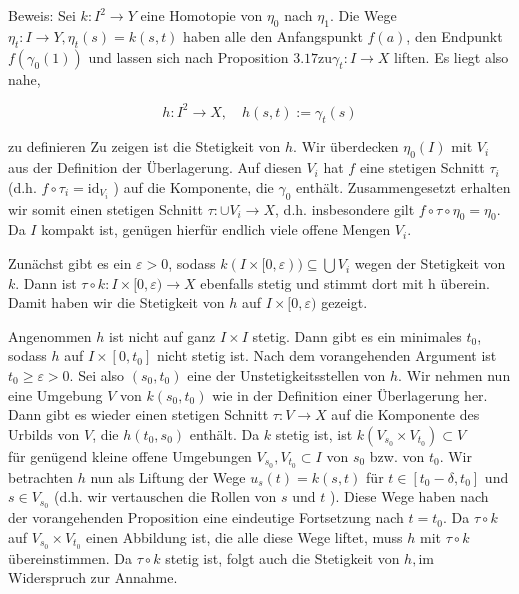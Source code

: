 \documentclass[10pt, letterpaper]{article}
\begin{document}
Beweis: Sei $k: I^{2} \rightarrow Y$ eine Homotopie von $\eta_{0}$ nach $\eta_{1}$. Die Wege $\eta_{t}: I \rightarrow Y, \eta_{t}(s)=k(s, t)$ haben alle den Anfangspunkt $f(a)$, den Endpunkt $f\left(\gamma_{0}(1)\right)$ und lassen sich nach Proposition $3.17 \mathrm{zu} \gamma_{t}: I \rightarrow X$ liften. Es liegt also nahe,

$$
h: I^{2} \rightarrow X, \quad h(s, t):=\gamma_{t}(s)
$$

zu definieren Zu zeigen ist die Stetigkeit von $h$. Wir überdecken $\eta_{0}(I)$ mit $V_{i}$ aus der Definition der Überlagerung. Auf diesen $V_{i}$ hat $f$ eine stetigen Schnitt $\tau_{i}$ (d.h. $f \circ \tau_{i}=\mathrm{id}_{V_{i}}$ ) auf die Komponente, die $\gamma_{0}$ enthält. Zusammengesetzt erhalten wir somit einen stetigen Schnitt $\tau: \cup V_{i} \rightarrow X$, d.h. insbesondere gilt $f \circ \tau \circ \eta_{0}=\eta_{0}$. Da $I$ kompakt ist, genügen hierfür endlich viele offene Mengen $V_{i}$.

Zunächst gibt es ein $\varepsilon>0$, sodass $k(I \times[0, \varepsilon)) \subseteq \bigcup V_{i}$ wegen der Stetigkeit von $k$. Dann ist $\tau \circ k: I \times[0, \varepsilon) \rightarrow X$ ebenfalls stetig und stimmt dort mit h überein. Damit haben wir die Stetigkeit von $h$ auf $I \times[0, \varepsilon)$ gezeigt.

Angenommen $h$ ist nicht auf ganz $I \times I$ stetig. Dann gibt es ein minimales $t_{0}$, sodass $h$ auf $I \times\left[0, t_{0}\right]$ nicht stetig ist. Nach dem vorangehenden Argument ist $t_{0} \geq \varepsilon>0$. Sei also $\left(s_{0}, t_{0}\right)$ eine der Unstetigkeitsstellen von $h$. Wir nehmen nun eine Umgebung $V$ von $k\left(s_{0}, t_{0}\right)$ wie in der Definition einer Überlagerung her. Dann gibt es wieder einen stetigen Schnitt $\tau: V \rightarrow X$ auf die Komponente des Urbilds von $V$, die $h\left(t_{0}, s_{0}\right)$ enthält. Da $k$ stetig ist, ist $k\left(V_{s_{0}} \times V_{t_{0}}\right) \subset V$\\
für genügend kleine offene Umgebungen $V_{s_{0}}, V_{t_{0}} \subset I$ von $s_{0}$ bzw. von $t_{0}$. Wir betrachten $h$ nun als Liftung der Wege $u_{s}(t)=k(s, t)$ für $t \in\left[t_{0}-\delta, t_{0}\right]$ und $s \in V_{s_{0}}$ (d.h. wir vertauschen die Rollen von $s$ und $t$ ). Diese Wege haben nach der vorangehenden Proposition eine eindeutige Fortsetzung nach $t=t_{0}$. Da $\tau \circ k$ auf $V_{s_{0}} \times V_{t_{0}}$ einen Abbildung ist, die alle diese Wege liftet, muss $h$ mit $\tau \circ k$ übereinstimmen. Da $\tau \circ k$ stetig ist, folgt auch die Stetigkeit von $h, \mathrm{im}$ Widerspruch zur Annahme.
\end{document}

